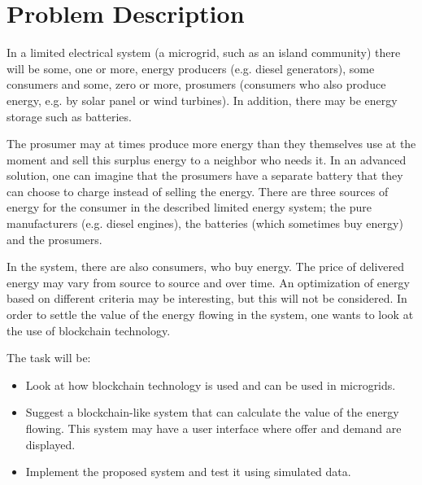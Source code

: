 \chapter*{Problem Description}
In a limited electrical system (a microgrid, such as an island community) there will be some, one or more, energy producers (e.g. diesel generators), some consumers and some, zero or more, prosumers (consumers who also produce energy, e.g. by solar panel or wind turbines). In addition, there may be energy storage such as batteries.

The prosumer may at times produce more energy than they themselves use at the moment and sell this surplus energy to a neighbor who needs it. In an advanced solution, one can imagine that the prosumers have a separate battery that they can choose to charge instead of selling the energy. There are three sources of energy for the consumer in the described limited energy system; the pure manufacturers (e.g. diesel engines), the batteries (which sometimes buy energy) and the prosumers.

In the system, there are also consumers, who buy energy. The price of delivered energy may vary from source to source and over time. An optimization of energy based on different criteria may be interesting, but this will not be considered. In order to settle the value of the energy flowing in the system, one wants to look at the use of blockchain technology.

The task will be:

\begin{itemize}
\item Look at how blockchain technology is used and can be used in microgrids.
\item Suggest a blockchain-like system that can calculate the value of the energy flowing. This system may have a user interface where offer and demand are displayed.
\item Implement the proposed system and test it using simulated data.
\end{itemize}